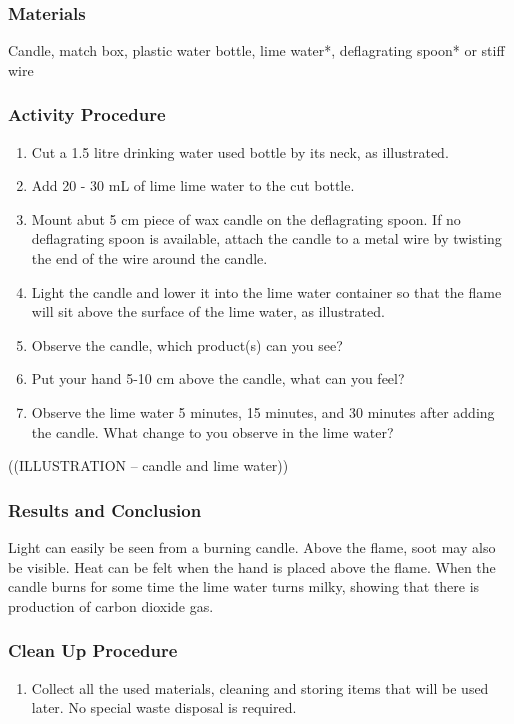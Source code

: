 \subsubsection*{Materials}
Candle, match box, plastic water bottle, lime water*, deflagrating spoon* or stiff wire

\subsubsection*{Activity Procedure}
\begin{enumerate}
\item{Cut a 1.5 litre drinking water used bottle by its neck, as illustrated.}
\item{Add 20 - 30 mL of lime lime water to the cut bottle.}
\item{Mount abut 5 cm piece of wax candle on the deflagrating spoon. If no deflagrating spoon is available, attach the candle to a metal wire by twisting the end of the wire around the candle.}
\item{Light the candle and lower it into the lime water container so that the flame will sit above the surface of the lime water, as illustrated.}
\item{Observe the candle, which product(s) can you see?}
\item{Put your hand 5-10 cm above the candle, what can you feel?}
\item{Observe the lime water 5 minutes, 15 minutes, and 30 minutes after adding the candle. What change to you observe in the lime water?}
\end{enumerate}

((ILLUSTRATION -- candle and lime water))

\subsubsection*{Results and Conclusion}
Light can easily be seen from a burning candle. Above the flame, soot may also be visible. Heat can be felt when the hand is placed above the flame. When the candle burns for some time the lime water turns milky, showing that there is production of carbon dioxide gas.

\subsubsection*{Clean Up Procedure}
\begin{enumerate}
\item{Collect all the used materials, cleaning and storing items that will be used later. No special waste disposal is required.}
\end{enumerate}

